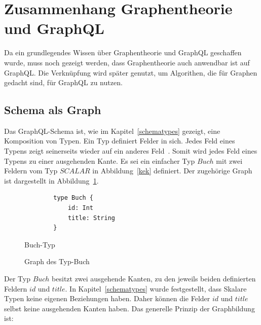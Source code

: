 \newpage
\section{Zusammenhang Graphentheorie und GraphQL}
\label{graphtheorieQL}

Da ein grundlegendes Wissen über Graphentheorie und GraphQL geschaffen wurde, muss noch gezeigt werden, dass Graphentheorie auch anwendbar ist auf GraphQL.
Die Verknüpfung wird später genutzt, um Algorithen, die für Graphen gedacht sind, für GraphQL zu nutzen.

\subsection{Schema als Graph}

Das GraphQL-Schema ist, wie im Kapitel~\ref{schematypes} gezeigt, eine Komposition von Typen.
Ein Typ definiert Felder in sich.
Jedes Feld eines Typens zeigt seinerseits wieder auf ein anderes Feld~\cite[vgl. Modelling with GraphQL]{graphqlgraphtheory}.
Somit wird jedes Feld eines Typens zu einer ausgehenden Kante.
Es sei ein einfacher Typ $Buch$ mit zwei Feldern vom Typ $SCALAR$ in Abbildung~\ref{kek} definiert.
Der zugehörige Graph ist dargestellt in Abbildung~\ref{kekl}.

\begin{figure}[ht]
    \centering
    \begin{minipage}[h]{0.45\textwidth}
        \begin{verbatim}
        type Buch {
            id: Int
            title: String
        }
        \end{verbatim}
        \caption{Buch-Typ}
        \label{kek}
    \end{minipage}
    \hfill
    \begin{minipage}[h]{0.45\textwidth}
        \caption{Graph des Typ-Buch}
        \label{kekl}
    \end{minipage}
\end{figure}

Der Typ $Buch$ besitzt zwei ausgehende Kanten, zu den jeweils beiden definierten Feldern $id$ und $title$.
In Kapitel~\ref{schematypes} wurde festgestellt, dass Skalare Typen keine eigenen Beziehungen haben.
Daher können die Felder $id$ und $title$ selbst keine ausgehenden Kanten haben.
Das generelle Prinzip der Graphbildung ist:

